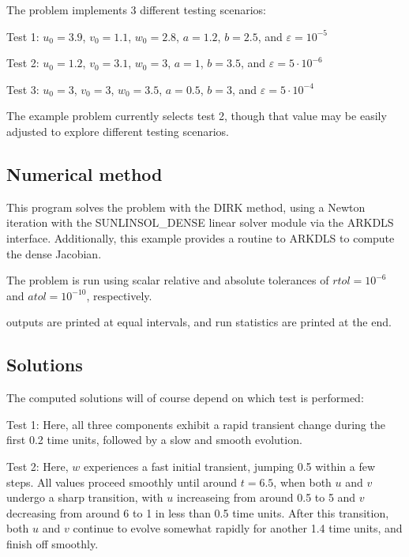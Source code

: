 \documentclass[letterpaper,10pt,english]{sphinxmanual}
\begin{document}
\sphinxAtStartPar
The problem implements 3 different testing scenarios:

\sphinxAtStartPar
Test 1:  \(u_0=3.9\),  \(v_0=1.1\),  \(w_0=2.8\),
\(a=1.2\), \(b=2.5\), and \(\varepsilon=10^{-5}\)

\sphinxAtStartPar
Test 2:  \(u_0=1.2\), \(v_0=3.1\), \(w_0=3\), \(a=1\),
\(b=3.5\), and \(\varepsilon=5\cdot10^{-6}\)

\sphinxAtStartPar
Test 3:  \(u_0=3\), \(v_0=3\), \(w_0=3.5\), \(a=0.5\),
\(b=3\), and \(\varepsilon=5\cdot10^{-4}\)

\sphinxAtStartPar
The example problem currently selects test 2, though that value may be
easily adjusted to explore different testing scenarios.


\subsection{Numerical method}
\label{\detokenize{c_serial:id6}}
\sphinxAtStartPar
This program solves the problem with the DIRK method, using a
Newton iteration with the SUNLINSOL\_DENSE linear solver module via
the ARKDLS interface.  Additionally, this example provides a routine
to ARKDLS to compute the dense Jacobian.

\sphinxAtStartPar
The problem is run using scalar relative and absolute tolerances of
\(rtol=10^{-6}\) and \(atol=10^{-10}\), respectively.

 outputs are printed at equal intervals, and run statistics
are printed at the end.


\subsection{Solutions}
\label{\detokenize{c_serial:id7}}
\sphinxAtStartPar
The computed solutions will of course depend on which test is
performed:

\sphinxAtStartPar
Test 1:  Here, all three components exhibit a rapid transient change
during the first 0.2 time units, followed by a slow and smooth
evolution.

\sphinxAtStartPar
Test 2: Here, \(w\) experiences a fast initial transient, jumping
0.5 within a few steps.  All values proceed smoothly until around
\(t=6.5\), when both \(u\) and \(v\) undergo a sharp
transition, with \(u\) increaseing from around 0.5 to 5 and
\(v\) decreasing from around 6 to 1 in less than 0.5 time units.
After this transition, both \(u\) and \(v\) continue to evolve
somewhat rapidly for another 1.4 time units, and finish off smoothly.
\end{document}

